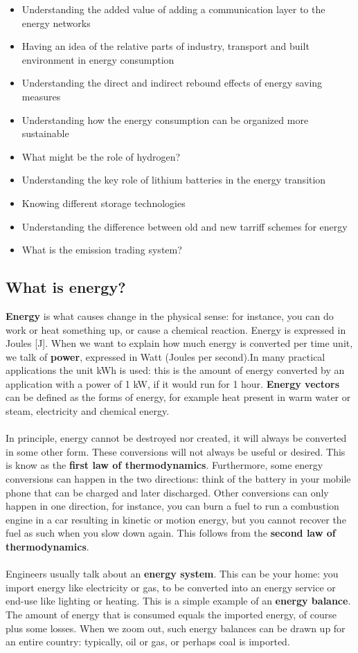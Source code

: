 \documentclass[../summary.tex]{subfiles}
\begin{document}
\begin{itemize}
		\item Understanding the added value of adding a communication layer to the energy networks
		\item Having an idea of the relative parts of industry, transport and built environment in energy consumption
		\item Understanding the direct and indirect rebound effects of energy saving measures
		\item Understanding how the energy consumption can be organized more sustainable
		\item What might be the role of hydrogen?
		\item Understanding the key role of lithium batteries in the energy transition
		\item Knowing different storage technologies
		\item Understanding the difference between old and new tarriff schemes for energy
		\item What is the emission trading system?
	\end{itemize}
	\newpage
	\subsection{What is energy?}
	
	\textbf{Energy} is what causes change in the physical sense: for instance, you can do work or heat something up, or cause a chemical reaction. Energy is expressed in Joules [J]. When we want to explain how much energy is converted per time unit, we talk of \textbf{power}, expressed in Watt (Joules per second).In many practical applications the unit kWh is used: this is the amount of energy converted by an application with a power of 1 kW, if it would run for 1 hour. \textbf{Energy vectors} can be defined as the forms of energy, for example heat present in warm water or steam, electricity and chemical energy.
	\\\\
	In principle, energy cannot be destroyed nor created, it will always be converted in some other form. These conversions will not always be useful or desired. This is know as the \textbf{first law of thermodynamics}. Furthermore, some energy conversions can happen in the two directions: think of the battery in your mobile phone that can be charged and later discharged. Other conversions can only happen in one direction, for instance, you can burn a fuel to run a combustion engine in a car resulting in kinetic or motion energy, but you cannot recover the fuel as such when you slow down again. This follows from the \textbf{second law of thermodynamics}.
	\\\\
	Engineers usually talk about an \textbf{energy system}. This can be your home: you import energy like electricity or gas, to be converted into an energy service or end-use like lighting or heating. This is a simple example of an \textbf{energy balance}. The amount of energy that is consumed equals the imported energy, of course plus some losses. When we zoom out, such energy balances can be drawn up for an entire country: typically, oil or gas, or perhaps coal is imported.
	
\end{document}
